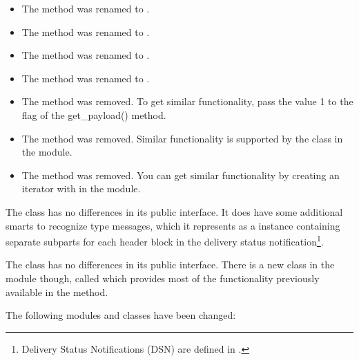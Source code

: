 \begin{itemize}
\item The method  was renamed to
      .

\item The method  was renamed to
      .

\item The method  was renamed to
      .

\item The method  was renamed to
      .

\item The method  was removed.  To get
      similar functionality, pass the value 1 to the  flag
      of the {get_payload()} method.

\item The method  was removed.  Similar
      functionality
      is supported by the  class in the
       module.

\item The method  was removed.  You can get
      similar functionality by creating an iterator with
       in the
       module.
\end{itemize}

The  class has no differences in its public interface.
It does have some additional smarts to recognize
 type messages, which it represents as
a  instance containing separate 
subparts for each header block in the delivery status
notification\footnote{Delivery Status Notifications (DSN) are defined
in .}.

The  class has no differences in its public
interface.  There is a new class in the 
module though, called  which provides most of
the functionality previously available in the
 method.

The following modules and classes have been changed:

